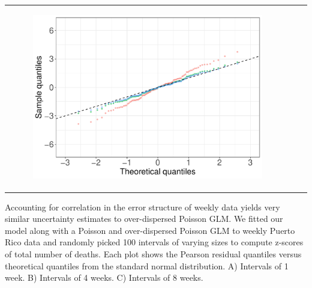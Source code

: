 \documentclass[11pt]{article}
\begin{document}
\begin{suppfigure}[ht]
\begin{tabular}{lll}
\begin{subfigure}[t]{0.30\linewidth}
		\includegraphics[width=1\linewidth]{figs/supp-figure-9c.pdf}
	\end{subfigure}\\
    \end{tabular}
    \caption{Accounting for correlation in the error structure of weekly data yields very similar uncertainty estimates to over-dispersed Poisson GLM. We fitted our model along with a Poisson and over-dispersed Poisson GLM to weekly Puerto Rico data and randomly picked 100 intervals of varying sizes to compute z-scores of total number of deaths. Each plot shows the Pearson residual quantiles versus theoretical quantiles from the standard normal distribution. A) Intervals of 1 week. B) Intervals of 4 weeks. C) Intervals of 8 weeks.}
    \label{supp-fig:weekly-correlated}
\end{suppfigure}
\end{document}

